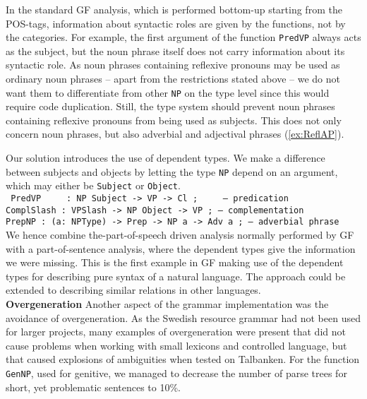 \documentclass[runningheads,a4paper]{llncs}
\begin{document}
In the standard GF analysis, which is performed bottom-up starting from the
POS-tags, information about syntactic roles are given by the functions, not by the
categories. For example, the first argument of the function 
\verb-PredVP- always acts as the subject, but the noun phrase itself does not carry
information about its syntactic role.
As noun phrases containing reflexive pronouns may be used as ordinary
noun phrases -- apart from the restrictions stated above --
we do not want them to differentiate
from other \verb-NP- on the type level since this would require code duplication.
Still, the type system should prevent noun phrases containing reflexive
pronouns from being used as subjects.
This does not only concern noun phrases, but also adverbial and adjectival phrases 
(\ref{ex:ReflAP}).

Our solution introduces the use of dependent types.
We make a difference between subjects and objects
by letting the type \verb-NP- depend on an argument, 
which may either be \verb-Subject- or \verb-Object-.\\
\small \texttt{
\indent PredVP  ~~~ : NP Subject -> VP        -> Cl ; ~~~ -- predication\\
\indent ComplSlash : VPSlash    -> NP Object -> VP ; -- complementation\\
\indent PrepNP       : (a: NPType) -> Prep -> NP a -> Adv a ; -- adverbial phrase \\
}
\normalsize
We hence combine the-part-of-speech driven analysis normally performed by
GF with a part-of-sentence analysis, where the dependent types give the 
information we were missing.
This is the first example in GF making use of the dependent types for 
describing pure syntax of a natural language. The approach could be extended
to describing similar relations
in other languages.\\

\noindent \textbf{Overgeneration}
Another aspect of the grammar implementation was the avoidance of overgeneration. As
the Swedish resource grammar had not been used for larger projects, many examples of
overgeneration were present that did not cause problems when working with small
lexicons and controlled language, but that caused explosions of ambiguities when 
tested on Talbanken. For the function \verb-GenNP-, used for genitive, we managed
to decrease the number of parse trees for short, yet problematic sentences to 10\%.
\end{document}
